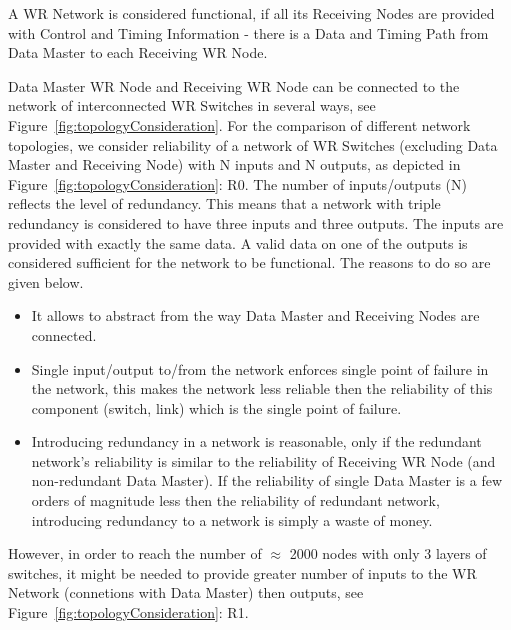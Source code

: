 A WR Network is considered functional, if all its Receiving Nodes are provided
with Control and Timing Information - there is a Data and Timing Path from Data
Master to each Receiving WR Node. 

Data Master WR Node and Receiving WR Node can be connected to the network of
interconnected WR Switches in several ways, see 
Figure~\ref{fig:topologyConsideration}. For the comparison of different
network topologies, we consider reliability of a network of WR Switches
(excluding Data Master and Receiving Node) with N inputs and N
outputs, as depicted in Figure~\ref{fig:topologyConsideration}: R0. The
number of inputs/outputs (N) reflects the level of redundancy. This means that a
network with triple redundancy is considered to have three inputs and three
outputs. The inputs are provided with exactly the same data. A valid data on
one of the outputs is considered sufficient for the network to be functional.
The reasons to do so are given below.
\begin{itemize}
  \item It allows to abstract from the way Data Master and Receiving Nodes are
connected.
  \item Single input/output to/from the network enforces single point of
failure in the network, this makes the network less reliable then the
reliability of this component (switch, link) which is the single point of
failure.
  \item Introducing redundancy in a network is reasonable, only if the
redundant network's reliability is similar to the reliability of Receiving WR
Node (and non-redundant Data Master). If the reliability of single Data Master
is a few orders of magnitude less then the reliability of redundant network,
introducing redundancy to a network is simply a waste of money.
\end{itemize}

However, in order to reach the number of $\approx$ 2000 nodes with only 3
layers of switches, it might be needed to provide greater number of inputs to
the WR Network (connetions with Data Master) then outputs, see
Figure~\ref{fig:topologyConsideration}: R1.

